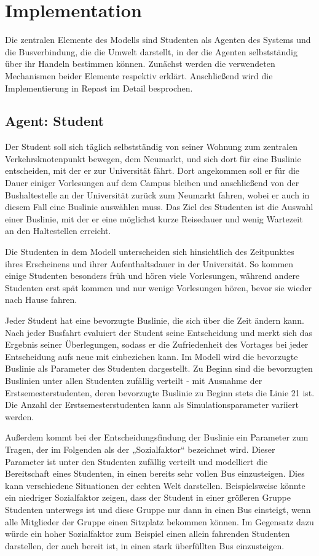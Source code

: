 \documentclass[12pt,a4paper]{scrartcl}
\begin{document}
\section{Implementation}\label{impl}
Die zentralen Elemente des Modells sind Studenten als Agenten des Systems und die Busverbindung, die die Umwelt darstellt, in der die Agenten selbstständig über ihr Handeln bestimmen können. Zunächst werden die verwendeten Mechanismen beider Elemente respektiv erklärt. Anschließend wird die Implementierung in Repast im Detail besprochen.

\subsection{Agent: Student}\label{agent}
Der Student soll sich täglich selbstständig von seiner Wohnung zum zentralen Verkehrsknotenpunkt bewegen, dem Neumarkt, und sich dort für eine Buslinie entscheiden, mit der er zur Universität fährt. Dort angekommen soll er für die Dauer einiger Vorlesungen auf dem Campus bleiben und anschließend von der Bushaltestelle an der Universität zurück zum Neumarkt fahren, wobei er auch in diesem Fall eine Buslinie auswählen muss. Das Ziel des Studenten ist die Auswahl einer Buslinie, mit der er eine möglichst kurze Reisedauer und wenig Wartezeit an den Haltestellen erreicht.

Die Studenten in dem Modell unterscheiden sich hinsichtlich des Zeitpunktes ihres Erscheinens und ihrer Aufenthaltsdauer in der Universität. So kommen einige Studenten besonders früh und hören viele Vorlesungen, während andere Studenten erst spät kommen und nur wenige Vorlesungen hören, bevor sie wieder nach Hause fahren.

Jeder Student hat eine bevorzugte Buslinie, die sich über die Zeit ändern kann. Nach jeder Busfahrt evaluiert der Student seine Entscheidung und merkt sich das Ergebnis seiner Überlegungen, sodass er die Zufriedenheit des Vortages bei jeder Entscheidung aufs neue mit einbeziehen kann. Im Modell wird die bevorzugte Buslinie als Parameter des Studenten dargestellt. Zu Beginn sind die bevorzugten Buslinien unter allen Studenten zufällig verteilt - mit Ausnahme der Erstsemesterstudenten, deren bevorzugte Buslinie zu Beginn stets die Linie 21 ist. Die Anzahl der Erstsemesterstudenten kann als Simulationsparameter variiert werden.

Außerdem kommt bei der Entscheidungsfindung der Buslinie ein Parameter zum Tragen, der im Folgenden als der „Sozialfaktor“ bezeichnet wird. Dieser Parameter ist unter den Studenten zufällig verteilt und modelliert die Bereitschaft eines Studenten, in einen bereits sehr vollen Bus einzusteigen. Dies kann verschiedene Situationen der echten Welt darstellen. Beispielsweise könnte ein niedriger Sozialfaktor zeigen, dass der Student in einer größeren Gruppe Studenten unterwegs ist und diese Gruppe nur dann in einen Bus einsteigt, wenn alle Mitglieder der Gruppe einen Sitzplatz bekommen können. Im Gegensatz dazu würde ein hoher Sozialfaktor zum Beispiel einen allein fahrenden Studenten darstellen, der auch bereit ist, in einen stark überfüllten Bus einzusteigen.
\end{document}
